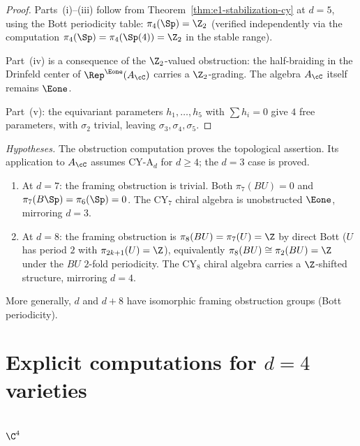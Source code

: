 \begin{proof}
Parts~(i)--(iii) follow from Theorem~\ref{thm:e1-stabilization-cy} at $d = 5$, using the Bott periodicity table: $\pi_4(\Sp) = \Z_2$ (verified independently via the computation $\pi_4(\Sp) = \pi_4(\Sp(4)) = \Z_2$ in the stable range).

Part~(iv) is a consequence of the $\Z_2$-valued obstruction: the half-braiding in the Drinfeld center of \(\Rep^{\Eone}(A_\cC)\) carries a $\Z_2$-grading. The algebra \(A_\cC\) itself remains \(\Eone\).

Part~(v): the equivariant parameters $h_1, \ldots, h_5$ with $\sum h_i = 0$ give $4$ free parameters, with $\sigma_2$ trivial, leaving $\sigma_3, \sigma_4, \sigma_5$.
\end{proof}


\begin{corollary}[\texorpdfstring{$d = 7$}{d = 7} mirrors \texorpdfstring{$d = 3$}{d = 3}; \texorpdfstring{$d = 8$}{d = 8} mirrors \texorpdfstring{$d = 4$}{d = 4}]
\label{cor:d7-d8-bott}
\noindent\emph{Hypotheses.} The obstruction computation proves the topological assertion. Its application to $A_\cC$ assumes CY-A$_d$ for $d \geq 4$; the $d=3$ case is proved.
\begin{enumerate}[label=\textup{(\roman*)}]
 \item At $d = 7$: the framing obstruction is trivial. Both $\pi_7(BU) = 0$ and $\pi_7(B\Sp) = \pi_6(\Sp) = 0$. The CY$_7$ chiral algebra is unobstructed $\Eone$, mirroring $d = 3$.
 \item At $d = 8$: the framing obstruction is $\pi_8(BU) = \pi_7(U) = \Z$ by direct Bott ($U$ has period $2$ with $\pi_{2k+1}(U) = \Z$), equivalently $\pi_8(BU) \cong \pi_2(BU) = \Z$ under the $BU$ $2$-fold periodicity. The CY$_8$ chiral algebra carries a $\Z$-shifted structure, mirroring $d = 4$.
\end{enumerate}
More generally, $d$ and $d + 8$ have isomorphic framing obstruction groups (Bott periodicity).
\end{corollary}


\section{Explicit computations for \texorpdfstring{$d = 4$}{d = 4} varieties}
\label{sec:d4-explicit}

\subsection{\texorpdfstring{$\C^4$}{C-4}}
\label{subsec:c4}

